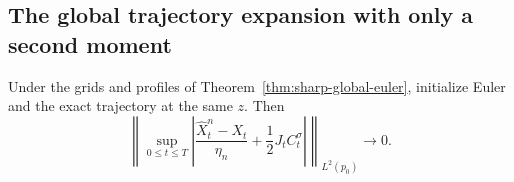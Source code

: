 \subsection{The global trajectory expansion with only a second moment}

\begin{lemma}
\label{lem:global-strong-expansion}
Under the grids and profiles of Theorem~\ref{thm:sharp-global-euler},
initialize Euler and the exact trajectory at the same $z$.  Then
\begin{equation}
 \left\|\sup_{0\le t\le T}
 \left|\frac{\widehat X_t^n-X_t}{\eta_n}
          +\frac12J_t C_t^\sigma\right|\right\|_{L^2(p_0)}
 \longrightarrow0.
 \label{eq:global-strong-expansion}
\end{equation}
\end{lemma}

